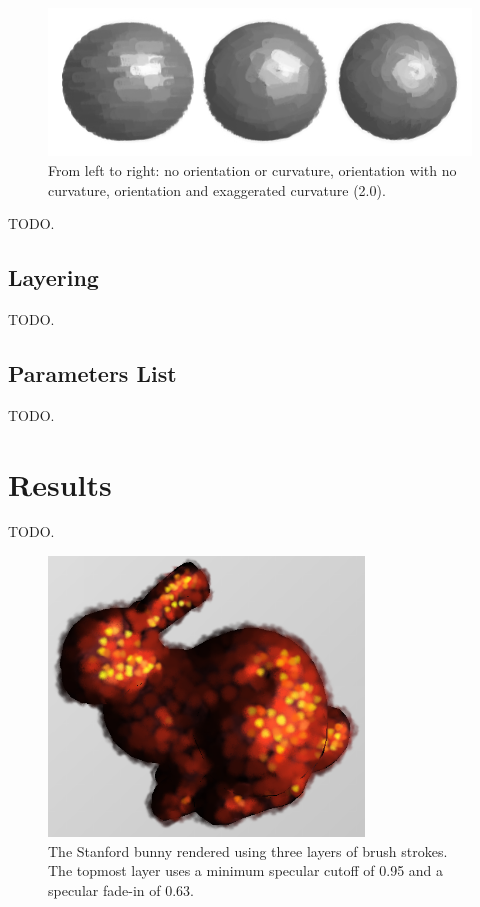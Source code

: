 \documentclass[conference]{acmsiggraph}
\begin{document}
\begin{figure}[ht]
  \centering
  \includegraphics[width=6.0in]{images/sphere_rotation_curve}
  \caption{From left to right: no orientation or curvature, orientation with
           no curvature, orientation and exaggerated curvature (2.0).}
\end{figure}

TODO.

\subsection{Layering}

TODO.

\subsection{Parameters List}

TODO.

\section{Results}

TODO.

\begin{figure}[ht]
  \centering
  \includegraphics[width=3.3in]{images/bunny_with_fade_in}
  \caption{The Stanford bunny rendered using three layers of brush strokes.
           The topmost layer uses a minimum specular cutoff of 0.95 and a
           specular fade-in of 0.63.}
\end{figure}
\end{document}
